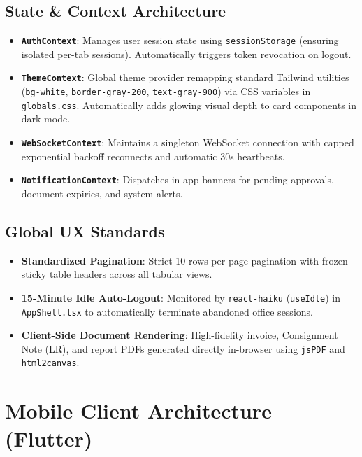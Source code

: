 \documentclass[11pt,a4paper]{article}
\begin{document}
\subsection{State \& Context Architecture}
\begin{itemize}[leftmargin=1.2em,itemsep=3pt]
  \item \textbf{\texttt{AuthContext}}: Manages user session state using \texttt{sessionStorage} (ensuring isolated per-tab sessions). Automatically triggers token revocation on logout.
  \item \textbf{\texttt{ThemeContext}}: Global theme provider remapping standard Tailwind utilities (\texttt{bg-white}, \texttt{border-gray-200}, \texttt{text-gray-900}) via CSS variables in \texttt{globals.css}. Automatically adds glowing visual depth to card components in dark mode.
  \item \textbf{\texttt{WebSocketContext}}: Maintains a singleton WebSocket connection with capped exponential backoff reconnects and automatic 30s heartbeats.
  \item \textbf{\texttt{NotificationContext}}: Dispatches in-app banners for pending approvals, document expiries, and system alerts.
\end{itemize}

\subsection{Global UX Standards}
\begin{itemize}[leftmargin=1.2em,itemsep=3pt]
  \item \textbf{Standardized Pagination}: Strict 10-rows-per-page pagination with frozen sticky table headers across all tabular views.
  \item \textbf{15-Minute Idle Auto-Logout}: Monitored by \texttt{react-haiku} (\texttt{useIdle}) in \texttt{AppShell.tsx} to automatically terminate abandoned office sessions.
  \item \textbf{Client-Side Document Rendering}: High-fidelity invoice, Consignment Note (LR), and report PDFs generated directly in-browser using \texttt{jsPDF} and \texttt{html2canvas}.
\end{itemize}

\section{Mobile Client Architecture (Flutter)}
\end{document}

